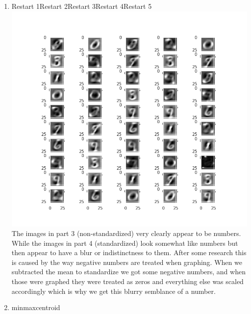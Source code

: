 \documentclass[submit]{harvardml}
\begin{document}
\begin{enumerate}
    \newpage
    \item\hspace{2.4 cm}Restart 1\hspace{1 cm}Restart 2\hspace{1 cm}Restart 3\hspace{1 cm}Restart 4\hspace{1 cm}Restart 5 \newline
    \includegraphics[scale=.70]{hw4/Pics/Part4.png}\newline
    The images in part 3 (non-standardized) very clearly appear to be numbers. While the images in part 4 (standardized) look somewhat like numbers but then appear to have a blur or indistinctness to them. After some research this is caused by the way negative numbers are treated when graphing. When we subtracted the mean to standardize we got some negative numbers, and when those were graphed they were treated as zeros and everything else was scaled accordingly which is why we get this blurry semblance of a number.
    \newpage
    \item \hspace{3.5cm}min\hspace{3.7 cm}max\hspace{3.5 cm}centroid\newline

\end{enumerate}
\end{document}
